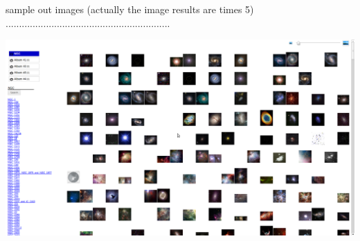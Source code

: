 \documentclass[15pt]{article}
\begin{document}
sample out images (actually the image results are times 5)\\
.............................................................\\

    
\vskip 5cm
\end{document}
